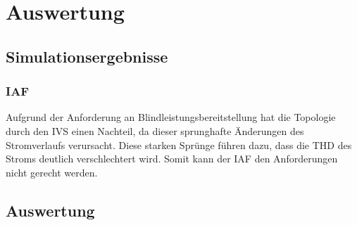 \chapter{Auswertung}
\section{Simulationsergebnisse}
\subsection{IAF}
Aufgrund der Anforderung an Blindleistungsbereitstellung hat die Topologie durch den \gls{IVS} einen Nachteil, da dieser sprunghafte Änderungen des Stromverlaufs verursacht. Diese starken Sprünge führen dazu, dass die \gls{THD} des Stroms deutlich verschlechtert wird. Somit kann der \gls{IAF} den Anforderungen nicht gerecht werden.
\section{Auswertung}